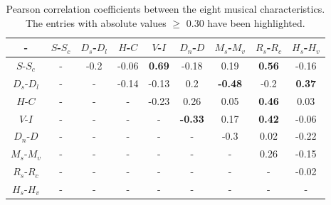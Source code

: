 \documentclass[
 aip,
 jmp,
 amsmath,amssymb,
 reprint,
]{revtex4-1}
\begin{document}
\begin{table}[ht]
  \caption{\label{tab:tableBmus}Pearson correlation coefficients
    between the eight musical characteristics. The entries with
    absolute values $\geq$ 0.30 have been highlighted.}
  \begin{ruledtabular}
    \begin{tabular}{|c||c|c|c|c|c|c|c|c|}
      -    & \tiny  $S$-$S_c$ & \tiny  $D_s$-$D_l$ & \tiny  $H$-$C$ 
      & \tiny  $V$-$I$ & \tiny  $D_n$-$D$ & \tiny  $M_s$-$M_v$ 
      & \tiny  $R_s$-$R_c$ & \tiny  $H_s$-$H_v$  \\ \hline

      \tiny$S$-$S_c$ 
      & - & -0.2 & -0.06 & \bf{0.69} & -0.18 & 0.19  & \bf{0.56} & -0.16 
      \\
      \tiny$D_s$-$D_l$ 
      & - & - & -0.14 & -0.13 & 0.2 & \bf{-0.48} & -0.2 & \bf{0.37}
      \\
      \tiny$H$-$C$ 
      & - & - & - & -0.23 & 0.26 & 0.05 & \bf{0.46} & 0.03 
      \\
      \tiny$V$-$I$ 
      & - & - & - & - & \bf{-0.33} & 0.17 & \bf{0.42} & -0.06 
      \\
      \tiny$D_n$-$D$ 
      & - & - & - & - & - & -0.3 & 0.02 & -0.22 
      \\
      \tiny$M_s$-$M_v$ 
      & - & - & - & - & - & - & 0.26 & -0.15
      \\
      \tiny$R_s$-$R_c$ 
      & - & - & - & - & - & - & - & -0.02 
      \\
      \tiny$H_s$-$H_v$ 
      & - & - & - & - & - & - & - & - 
      \\
    \end{tabular}
  \end{ruledtabular}
\end{table}
\end{document}

